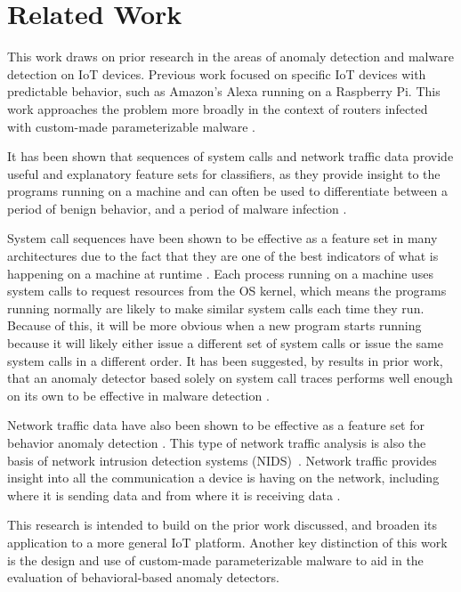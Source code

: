 \documentclass[runningheads]{llncs}
\begin{document}
\section{Related Work}
This work draws on prior research in the areas of anomaly detection and malware detection on IoT devices. Previous work focused on specific IoT devices with predictable behavior, such as Amazon's Alexa running on a Raspberry Pi. This work approaches the problem more broadly in the context of routers infected with custom-made parameterizable malware \cite{MALWARE19} \cite{Noorani2019AutomaticMD}.


\indent It has been shown that sequences of system calls and network traffic data provide useful and explanatory feature sets for classifiers, as they provide insight to the programs running on a machine and can often be used to differentiate between a period of benign behavior, and a period of malware infection \cite{MALWARE19}. 

\indent System call sequences have been shown to be effective as a feature set in many architectures due to the fact that they are one of the best indicators of what is happening on a machine at runtime \cite{MALWARE19} \cite{8659366}. 
Each process running on a machine uses system calls to request resources from the OS kernel, which means the programs running normally are likely to make similar system calls each time they run. 
Because of this, it will be more obvious when a new program starts running because it will likely either issue a different set of system calls or issue the same system calls in a different order. 
It has been suggested, by results in prior work, that an anomaly detector based solely on system call traces performs well enough on its own to be effective in malware detection \cite{MALWARE19}.

\indent Network traffic data have also been shown to be effective as a feature set for behavior anomaly detection \cite{Doshi_2018} \cite{8093473}. 
This type of network traffic analysis is also the basis of network intrusion detection systems (NIDS)~\cite{DBLP:journals/corr/abs-1901-03407,6524462,nids1}.
Network traffic provides insight into all the communication a device is having on the network, including where it is sending data and from where it is receiving data \cite{MALWARE19}. 


\indent This research is intended to build on the prior work discussed, and broaden its application to a more general IoT platform. Another key distinction of this work is the design and use of custom-made parameterizable malware to aid in the evaluation of behavioral-based anomaly detectors.
\end{document}

